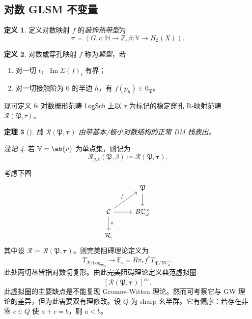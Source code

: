 \documentclass{amsart}
\newtheorem{thm}{定理}[section]
\theoremstyle{definition}
\newtheorem{defn}[thm]{定义}
\theoremstyle{remark}
\newtheorem{rmk}[thm]{注记}
\theoremstyle{plain}
\theoremstyle{definition}
\theoremstyle{remark}
\DeclareMathOperator{\Ima}{Im}
\newcommand{\C}{\mathbb{C}}
\newcommand{\Z}{\mathbb{Z}}
\newcommand{\E}{\mathbb{E}}
\newcommand{\V}{\mathbb{V}}
\renewcommand{\H}{\mathbb{H}}
\newcommand{\mc}[1]{\mathcal{#1}}
\newcommand{\mf}[1]{\mathfrak{#1}}
\newcommand{\mr}[1]{\mathrm{#1}}
\newcommand{\ms}[1]{\mathsf{#1}}
\newcommand{\1}{\mathbf{1}}
\newcommand{\2}{\mathbf{2}}
\newcommand{\3}{\mathbf{3}}
\newcommand{\vir}{\mr{vir}}
\begin{document}
\subsection{对数 GLSM 不变量}%
\label{sub:Log GLSM invariants}

\begin{defn}
    定义对数映射 \(f\) 的\textit{装饰热带型}为
    \[ \bm{\tau} = (G, c \colon \H \to \Z, \beta \colon \V \to H_2(X)). \]
\end{defn}

\begin{defn}
    对数或穿孔映射 \(f\) 称为\textit{紧型}，若
    \begin{enumerate}
        \item 对一切 \(t\)，\(\Ima \Sigma(f)_t\) 有界；
        \item 对一切接触阶为 \(0\) 的半边 \(h\)，有 \(f(p_h) \in 0_{\mf{P}}\)。
    \end{enumerate}
\end{defn}

现可定义 fs 对数概形范畴 \(\ms{LogSch}\) 上以 \(\tau\) 为标记的稳定穿孔 R-映射范畴 \(\mc{R}(\mf{P}, \tau)\)。

\begin{thm}[{\cite{CJR2021,CJRpunctured}}]
    栈 \(\mc{R}(\mf{P},\bm{\tau})\) 由带基本/极小对数结构的正常 DM 栈表出。
\end{thm}

\begin{rmk}
    若 \(\V = \ab\{v\}\) 为单点集，则记为
    \[ \mc{R}_{g, c}(\mf{P}, \beta) \coloneqq \mc{R}(\mf{P}, \bm{\tau}). \]
\end{rmk}

考虑下图
\begin{equation*}
\begin{tikzcd}
    & \mf{P} \ar{d} \\
    \mc{C} \ar{ur}{f} \ar{d}{\pi} \ar{r} & B \C_{\omega}^{\times} \\
    \mc{R},
\end{tikzcd}
\end{equation*}
其中设 \(\mc{R} \coloneqq \mc{R}(\mf{P}, \bm{\tau})\)。则完美阻碍理论定义为
\[ T_{\mc{R}/\ms{Log}_{\mf{M}_G}} \to \E_{\square} = R \pi_* f^* T_{\mf{P}/B\C_{\omega}^{\times}}. \]
此处两切丛皆指对数切复形。由此完美阻碍理论定义典范虚拟圈
\[ [\mc{R}(\mf{P}, \bm{\tau})]^{\vir}. \]
此虚拟圈的主要缺点是不能复现 Gromov-Witten 理论。然而可考察它与 GW 理论的差异，但为此需要双有理修改。设 \(Q\) 为 sharp 幺半群。它有偏序：若存在非零 \(c \in Q\) 使 \(a+c = b\)，则 \(a < b\)。
\end{document}
